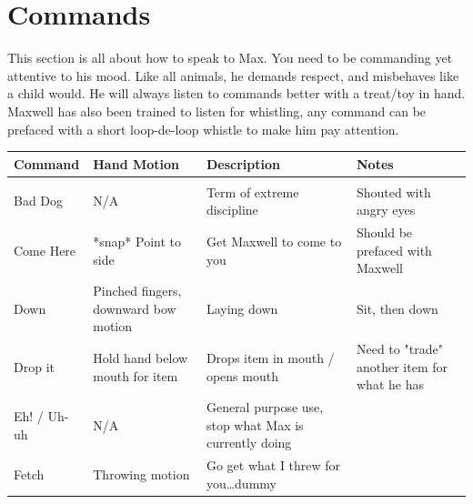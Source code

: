 \documentclass[pdftex,12pt]{article}
\begin{document}
\newpage
\section{Commands}

This section is all about how to speak to Max. You need to be commanding yet
attentive to his mood. Like all animals, he demands respect, and misbehaves like
a child would. He will always listen to commands better with a treat/toy in
hand. Maxwell has also been trained to listen for whistling, any command can be
prefaced with a short loop-de-loop whistle to make him pay attention.

\begin{table}[H]
    \label{tab:commands}
    \begin{adjustwidth}{-4.5cm}{-4.5cm}
        \begin{center}
            \begin{tabular}{lp{}p{}p{}}
                Command     & Hand Motion                                      &
                Description                                           & Notes
                \\ \hline \\
                Bad Dog     & N/A                                              & Term of extreme discipline                            & Shouted with angry eyes                                            \\
                Come Here   & *snap* Point to side                             & Get Maxwell to come to you                            & Should be prefaced with Maxwell                                    \\
                Down        & Pinched fingers, downward bow motion             & Laying down                                           & Sit, then down                                                     \\
                Drop it     & Hold hand below mouth for item                   & Drops item in mouth / opens mouth                     & Need to "trade" another item for what he has                       \\
                Eh! / Uh-uh & N/A                                              & General purpose use, stop what Max is currently doing &                                                                    \\
                Fetch       & Throwing motion                                  & Go get
                what I threw for you\ldots dummy                   &                                                                    \\

\end{tabular}
\end{center}
\end{adjustwidth}
\end{table}
\end{document}
